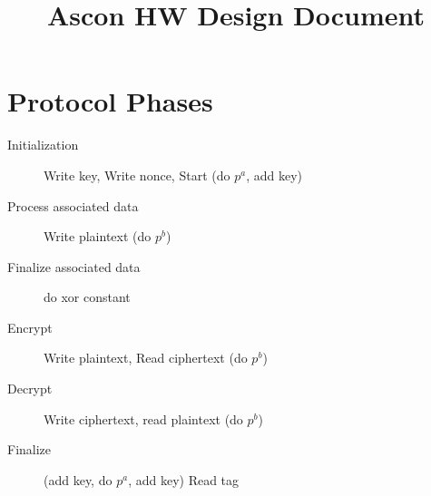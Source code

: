\documentclass[runningheads]{llncs}
\title{Ascon HW Design Document}
\author{}
\institute{}
\let\maketitleorig\maketitle
\renewcommand{\maketitle}{\maketitleorig\thispagestyle{plain}}
\begin{document}
\maketitle

\section{Protocol Phases}

\begin{description}
\item[Initialization] Write key, Write nonce, Start (do $p^a$, add key)
\item[Process associated data] Write plaintext (do $p^b$)
\item[Finalize associated data] do xor constant
\item[Encrypt] Write plaintext, Read ciphertext (do $p^b$) 
\item[Decrypt] Write ciphertext, read plaintext (do $p^b$)
\item[Finalize] (add key, do $p^a$, add key) Read tag
\end{description}







 

\appendix
\end{document}
